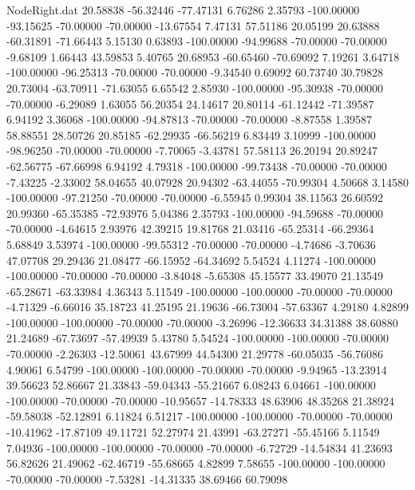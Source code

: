 \begin{filecontents}{NodeRight.dat}
  20.58838  -56.32446  -77.47131     6.76286    2.35793 -100.00000  -93.15625  -70.00000  -70.00000  -13.67554    7.47131   57.51186   20.05199
  20.63888  -60.31891  -71.66443     5.15130    0.63893 -100.00000  -94.99688  -70.00000  -70.00000   -9.68109    1.66443   43.59853    5.40765
  20.68953  -60.65460  -70.69092     7.19261    3.64718 -100.00000  -96.25313  -70.00000  -70.00000   -9.34540    0.69092   60.73740   30.79828
  20.73004  -63.70911  -71.63055     6.65542    2.85930 -100.00000  -95.30938  -70.00000  -70.00000   -6.29089    1.63055   56.20354   24.14617
  20.80114  -61.12442  -71.39587     6.94192    3.36068 -100.00000  -94.87813  -70.00000  -70.00000   -8.87558    1.39587   58.88551   28.50726
  20.85185  -62.29935  -66.56219     6.83449    3.10999 -100.00000  -98.96250  -70.00000  -70.00000   -7.70065   -3.43781   57.58113   26.20194
  20.89247  -62.56775  -67.66998     6.94192    4.79318 -100.00000  -99.73438  -70.00000  -70.00000   -7.43225   -2.33002   58.04655   40.07928
  20.94302  -63.44055  -70.99304     4.50668    3.14580 -100.00000  -97.21250  -70.00000  -70.00000   -6.55945    0.99304   38.11563   26.60592
  20.99360  -65.35385  -72.93976     5.04386    2.35793 -100.00000  -94.59688  -70.00000  -70.00000   -4.64615    2.93976   42.39215   19.81768
  21.03416  -65.25314  -66.29364     5.68849    3.53974 -100.00000  -99.55312  -70.00000  -70.00000   -4.74686   -3.70636   47.07708   29.29436
  21.08477  -66.15952  -64.34692     5.54524    4.11274 -100.00000 -100.00000  -70.00000  -70.00000   -3.84048   -5.65308   45.15577   33.49070
  21.13549  -65.28671  -63.33984     4.36343    5.11549 -100.00000 -100.00000  -70.00000  -70.00000   -4.71329   -6.66016   35.18723   41.25195
  21.19636  -66.73004  -57.63367     4.29180    4.82899 -100.00000 -100.00000  -70.00000  -70.00000   -3.26996  -12.36633   34.31388   38.60880
  21.24689  -67.73697  -57.49939     5.43780    5.54524 -100.00000 -100.00000  -70.00000  -70.00000   -2.26303  -12.50061   43.67999   44.54300
  21.29778  -60.05035  -56.76086     4.90061    6.54799 -100.00000 -100.00000  -70.00000  -70.00000   -9.94965  -13.23914   39.56623   52.86667
  21.33843  -59.04343  -55.21667     6.08243    6.04661 -100.00000 -100.00000  -70.00000  -70.00000  -10.95657  -14.78333   48.63906   48.35268
  21.38924  -59.58038  -52.12891     6.11824    6.51217 -100.00000 -100.00000  -70.00000  -70.00000  -10.41962  -17.87109   49.11721   52.27974
  21.43991  -63.27271  -55.45166     5.11549    7.04936 -100.00000 -100.00000  -70.00000  -70.00000   -6.72729  -14.54834   41.23693   56.82626
  21.49062  -62.46719  -55.68665     4.82899    7.58655 -100.00000 -100.00000  -70.00000  -70.00000   -7.53281  -14.31335   38.69466   60.79098

\end{filecontents}
